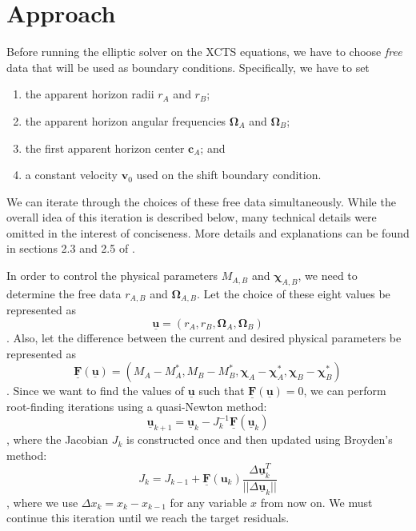 \documentclass{../letter}
\renewcommand{\v}[1]{\boldsymbol{#1}}
\newcommand{\vv}[1]{\underline{\boldsymbol{#1}}}
\begin{document}
	\section{Approach}

	Before running the elliptic solver on the XCTS equations, we have to choose \textit{free} data that will be used as boundary conditions. Specifically, we have to set
	\begin{enumerate}
		\item the apparent horizon radii $r_A$ and $r_B$;
		\item the apparent horizon angular frequencies $\v \Omega_A$ and $\v \Omega_B$;
		\item the first apparent horizon center $\v c_A$; and
		\item a constant velocity $\v v_0$ used on the shift boundary condition.
	\end{enumerate}

	We can iterate through the choices of these free data simultaneously. While the overall idea of this iteration is described below, many technical details were omitted in the interest of conciseness. More details and explanations can be found in sections 2.3 and 2.5 of \cite{Serguei}.

	In order to control the physical parameters $M_{A,B}$ and $\v\chi_{A,B}$, we need to determine the free data $r_{A,B}$ and $\v\Omega_{A,B}$. Let the choice of these eight values be represented as
	\begin{equation}
		\vv u = (r_A, r_B, \v\Omega_A, \v\Omega_B)
	\end{equation}
	\cite{Serguei}. Also, let the difference between the current and desired physical parameters be represented as
	\begin{equation}
		\vv F(\vv u) = (M_A - M_A^*, M_B - M_B^*, \v \chi_A - \v \chi_A^*, \v \chi_B - \v \chi_B^*)
	\end{equation}
	 \cite{Serguei}. Since we want to find the values of $\vv u$ such that $\vv F(\vv u) = 0$, we can perform root-finding iterations using a quasi-Newton method:
	\begin{equation}
		\vv u_{k+1} = \vv u_k - J_k^{-1} \vv F(\vv u_k)
	\end{equation}
	\cite{Serguei}, where the Jacobian $J_k$ is constructed once and then updated using Broyden's method:
	\begin{equation}
		J_k = J_{k-1} + \vv F(\v u_k) \frac{\Delta \vv u_k^T}{||\Delta \vv u_k||}
	\end{equation}
	\cite{Serguei}, where we use $\Delta x_k = x_k - x_{k-1}$ for any variable $x$ from now on. We must continue this iteration until we reach the target residuals.
\end{document}
